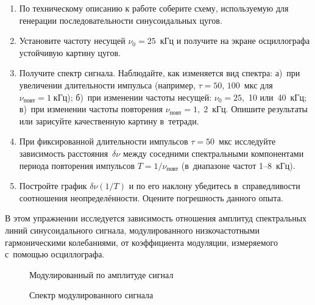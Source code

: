 \begin{lab:task}
\begin{enumerate}
\item По техническому описанию к работе соберите схему, используемую
для генерации последовательности синусоидальных цугов.

\item Установите частоту несущей $\nu_0=25$~кГц и получите на экране осциллографа
устойчивую картину цугов.

\item Получите спектр сигнала. Наблюдайте, как изменяется вид спектра:
а)~при увеличении длительности импульса (например, $\tau=50$, $100$~мкс
для $\nu_\text{повт}=1\;кГц$); б)~при изменении частоты несущей:
$\nu_0=25$,~10 или~40~кГц; в)~при изменении частоты повторения
$\nu_{повт}=1,\;2$~кГц. Опишите результаты или зарисуйте качественную
картину в~тетради.

\item При фиксированной длительности импульсов $\tau=50$~мкс исследуйте
зависимость расстояния~$\delta \nu$ между соседними спектральными компонентами
периода повторения импульсов $T=1/\nu_\text{повт}$
(в~диапазоне частот 1--8~кГц).

\item Постройте график $\delta \nu(1/T)$ и по его наклону
убедитесь в~справедливости соотношения неопределённости.
Оцените погрешность данного опыта.

\end{enumerate}


В этом упражнении исследуется зависимость отношения амплитуд спектральных линий
синусоидального сигнала, модулированного низкочастотными гармоническими
колебаниями, от коэффициента модуляции, измеряемого с~помощью осциллографа.

\begin{figure}[h!]
\hfil\hfil
\begin{minipage}{0.4\textwidth}
    \caption{Модулированный по амплитуде сигнал}
\end{minipage}
\hfil
\begin{minipage}{0.4\textwidth}
    \caption{Спектр модулированного сигнала}
\end{minipage}
\end{figure}


\end{lab:task}
